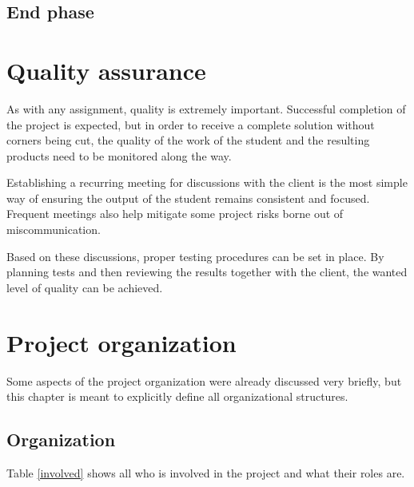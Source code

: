 \documentclass{report}
\begin{document}
	\section{End phase}\label{end_phase}
	
	
	
	
	
	\chapter{Quality assurance}\label{quality_assurance}
	As with any assignment, quality is extremely important. Successful completion of the project is expected, but in order to receive a complete solution without corners being cut, the quality of the work of the student and the resulting products need to be monitored along the way.
	
	Establishing a recurring meeting for discussions with the client is the most simple way of ensuring the output of the student remains consistent and focused. Frequent meetings also help mitigate some project risks borne out of miscommunication.
	
	Based on these discussions, proper testing procedures can be set in place. By planning tests and then reviewing the results together with the client, the wanted level of quality can be achieved.
	
	\chapter{Project organization}
	Some aspects of the project organization were already discussed very briefly, but this chapter is meant to explicitly define all organizational structures.
	
	\section{Organization}
	Table \ref{involved} shows all who is involved in the project and what their roles are.
	
\end{document}
